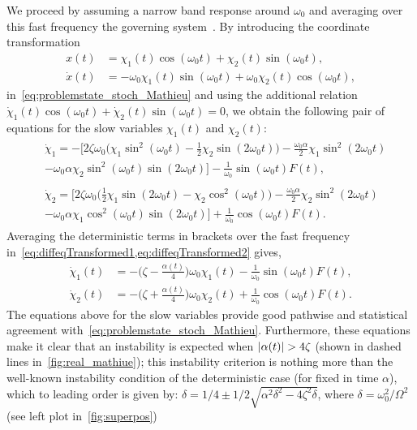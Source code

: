 \documentclass[3p]{elsarticle}
\DeclarePairedDelimiter\abs{\lvert}{\rvert}
\begin{document}
We proceed by assuming a narrow band response around $\omega_0$ and averaging over this fast frequency the governing system~. By introducing the   coordinate  transformation
\begin{equation}\label{eq:transformation}
    \begin{aligned}
        x(t) &= \chi_1(t) \cos(\omega_0 t) + \chi_2(t) \sin(\omega_0 t), \\
        \dot x(t) &=  -  \omega_0 \chi_1(t) \sin(\omega_0 t) + \omega_0 \chi_2(t) \cos(\omega_0 t), 
    \end{aligned}
\end{equation}
in~\cref{eq:problemstate_stoch_Mathieu} and using the additional relation $\dot \chi_1(t) \cos(\omega_0 t) + \dot \chi_2(t) \sin(\omega_0 t) = 0$, we obtain the following pair of   equations for the slow variables  $\chi_1(t)$ and $\chi_2(t)$:
\begin{align}
    &\begin{multlined} \label{eq:diffeqTransformed1}
        \dot \chi_1   = - \biggl[  2\zeta \omega_0 \biggl(\chi_1 \sin^2(\omega_0 t) -  \frac{1}{2} \chi_2 \sin(2\omega_0 t)\biggr) -\frac{\omega_0 \alpha}{2} \chi_1 \sin^2(2 \omega_{0} t)    \\-\omega_0 \alpha \chi_2 \sin^2(\omega_0 t) \sin(2\omega _{0}t)   \biggr] - \frac{1}{ \omega_0} \sin( \omega_0 t) F(t),
    \end{multlined}\\   
    &\begin{multlined} 
        \dot \chi_2   =   \biggl[  2\zeta \omega_0 \biggl( \frac{1}{2} \chi_1 \sin(2 \omega_0 t) -    \chi_2\cos^2( \omega_0 t)\biggr)  -\frac{\omega_0 \alpha}{2} \chi_2 \sin^2(2 \omega_{0} t)     \\-\omega_0 \alpha  \chi_1 \cos^2(\omega_0 t) \sin(2\omega_{0} t)   \biggr]  + \frac{1}{ \omega_0} \cos( \omega_0 t) F(t).
    \end{multlined} \label{eq:diffeqTransformed2}
\end{align}
Averaging the deterministic terms in brackets over the fast frequency  in~\cref{eq:diffeqTransformed1,eq:diffeqTransformed2}   gives,
\begin{align}\label{eq:averagedeqnsx1}
    \dot \chi_1(t) &= -\biggl( \zeta  -\frac{ \alpha(t)}{4} \biggr)\omega_0  \chi_1(t) - \frac{1}{ \omega_0} \sin( \omega_0 t) F(t),\\
    \dot \chi_2(t) &= -\biggl( \zeta  + \frac{ \alpha(t)}{4} \biggr)\omega_0  \chi_2(t) + \frac{1}{ \omega_0} \cos( \omega_0 t) F(t).\label{eq:averagedeqnsx2} 
\end{align}
The equations above for the slow variables provide good pathwise and statistical agreement with~\cref{eq:problemstate_stoch_Mathieu}. Furthermore, these equations make it clear that an instability is expected when  $\abs{\alpha(t)} > 4\zeta$ (shown in dashed lines in~\cref{fig:real_mathiue}); this instability criterion is nothing more than the    well-known instability condition of the deterministic case (for fixed in time $\alpha$), which   to leading order is given by: $\delta = 1/4 \pm 1/2\sqrt{\alpha^2\delta^2-4\zeta^2\delta}$, where $\delta = \omega_0^2/\Omega^2$ (see left plot in~\cref{fig:superpos})
\end{document}
